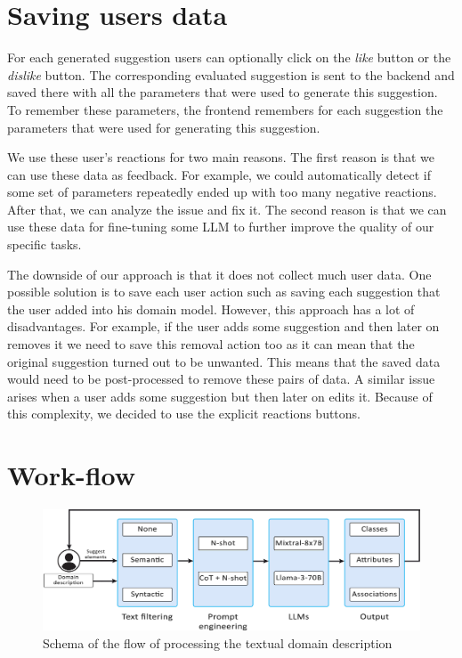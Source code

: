 \section{Saving users data}

For each generated suggestion users can optionally click on the \textit{like} button or the \textit{dislike} button. The corresponding evaluated suggestion is sent to the backend and saved there with all the parameters that were used to generate this suggestion. To remember these parameters, the frontend remembers for each suggestion the parameters that were used for generating this suggestion.

We use these user's reactions for two main reasons. The first reason is that we can use these data as feedback. For example, we could automatically detect if some set of parameters repeatedly ended up with too many negative reactions. After that, we can analyze the issue and fix it. The second reason is that we can use these data for fine-tuning some LLM to further improve the quality of our specific tasks.

The downside of our approach is that it does not collect much user data. One possible solution is to save each user action such as saving each suggestion that the user added into his domain model. However, this approach has a lot of disadvantages. For example, if the user adds some suggestion and then later on removes it we need to save this removal action too as it can mean that the original suggestion turned out to be unwanted. This means that the saved data would need to be post-processed to remove these pairs of data. A similar issue arises when a user adds some suggestion but then later on edits it. Because of this complexity, we decided to use the explicit reactions buttons.


\section{Work-flow}

\begin{figure}[!h]
    \centering
    \includegraphics[scale=0.23]{img/work-flow.jpg}
    \caption{\centering Schema of the flow of processing the textual domain description}
    \label{fig:work-flow}
\end{figure}

